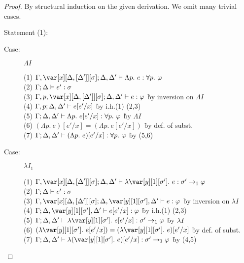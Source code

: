 \begin{proof}
By structural induction on the given derivation. We omit many trivial cases.

Statement (1):
\begin{description}

\item[Case:] $\Lambda I$
\begin{tabbing}
    (1) $\G, \xD; \D, \D' \vdash \Lambda p.~e : \forall p.~\vp$\\
    (2) $\Gamma; \Delta \vdash e' : \sigma$\\
    (3) $\G, p, \xD; \D, \D' \vdash e : \vp$ \` by inversion on $\Lambda I$\\
    (4) $\Gamma, p; \Delta, \Delta' \vdash e[e'/x]$ \` by i.h.(1) (2,3)\\
    (5) $\Gamma; \Delta, \Delta' \vdash \Lambda p.~e[e'/x] : \forall p.~\varphi$ \` by $\Lambda I$ \\
    (6) $(\Lambda p.~e)[e'/x] = (\Lambda p.~e[e'/x])$ \` by def. of subst.\\
    (7) $\Gamma; \Delta, \Delta' \vdash (\Lambda p.~e)[e'/x] : \forall p.~\varphi$ \` by (5,6)\\
\end{tabbing}


\item[Case:] $\lambda I_1$
\begin{tabbing}
    (1) $\G, \xD; \D, \D' \vdash \lambda \y[1][\s'].~e : \s' \to_1 \vp$\\
    (2) $\Gamma; \Delta \vdash e' : \sigma$\\
    (3) $\G, \xD; \D, \y[1][\s'], \D' \vdash e : \vp$ \` by inversion on $\lambda I$\\
    (4) $\G; \D, \y[1][\s'], \D' \vdash e[e'/x] : \vp$ \` by i.h.(1) (2,3)\\
    (5) $\G; \D, \D' \vdash \lambda \y[1][\s'].~e[e'/x] : \s' \to_1 \vp$ \` by $\lambda I$\\
    (6) $(\lambda \y[1][\s'].~e[e'/x]) = (\lambda \y[1][\s'].~e)[e'/x]$ \` by def. of subst.\\
    (7) $\G; \D, \D' \vdash \lambda (\y[1][\s'].~e)[e'/x] : \s' \to_1 \vp$ \` by (4,5)\\
\end{tabbing}


\end{description}
\end{proof}

